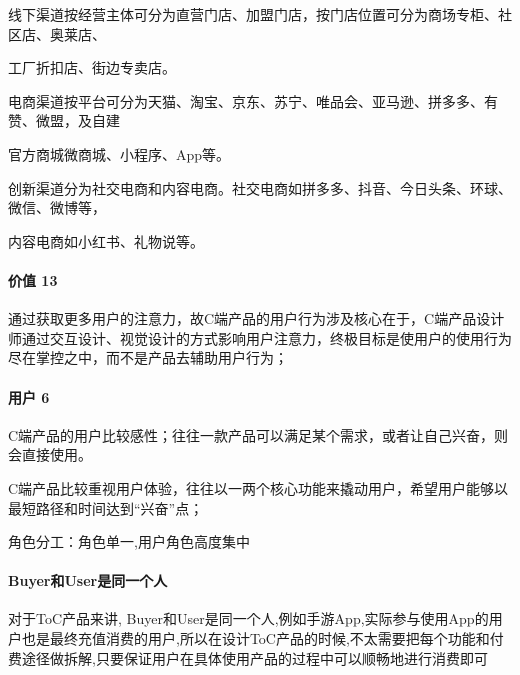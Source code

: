 \documentclass[letterpaper,11pt,english]{sphinxmanual}
\begin{document}
线下渠道按经营主体可分为直营门店、加盟门店，按门店位置可分为商场专柜、社区店、奥莱店、

工厂折扣店、街边专卖店。

电商渠道按平台可分为天猫、淘宝、京东、苏宁、唯品会、亚马逊、拼多多、有赞、微盟，及自建

官方商城微商城、小程序、App等。

创新渠道分为社交电商和内容电商。社交电商如拼多多、抖音、今日头条、环球、微信、微博等，

内容电商如小红书、礼物说等。


\paragraph{价值 13\sphinxfootnotemark[31]}
\label{\detokenize{chapter_introduction/2C:id5}}%
\begin{footnotetext}[31]\sphinxAtStartFootnote
{}
%
\end{footnotetext}\ignorespaces 
通过获取更多用户的注意力，故C端产品的用户行为涉及核心在于，C端产品设计师通过交互设计、视觉设计的方式影响用户注意力，终极目标是使用户的使用行为尽在掌控之中，而不是产品去辅助用户行为；


\paragraph{用户 6\sphinxfootnotemark[32]}
\label{\detokenize{chapter_introduction/2C:id6}}%
\begin{footnotetext}[32]\sphinxAtStartFootnote
{}
%
\end{footnotetext}\ignorespaces 
C端产品的用户比较感性；往往一款产品可以满足某个需求，或者让自己兴奋，则会直接使用。

C端产品比较重视用户体验，往往以一两个核心功能来撬动用户，希望用户能够以最短路径和时间达到“兴奋”点；

角色分工：角色单一,用户角色高度集中


\paragraph{Buyer和User是同一个人}
\label{\detokenize{chapter_introduction/2C:buyeruser}}
对于ToC产品来讲,
Buyer和User是同一个人,例如手游App,实际参与使用App的用户也是最终充值消费的用户,所以在设计ToC产品的时候,不太需要把每个功能和付费途径做拆解,只要保证用户在具体使用产品的过程中可以顺畅地进行消费即可
\end{document}
